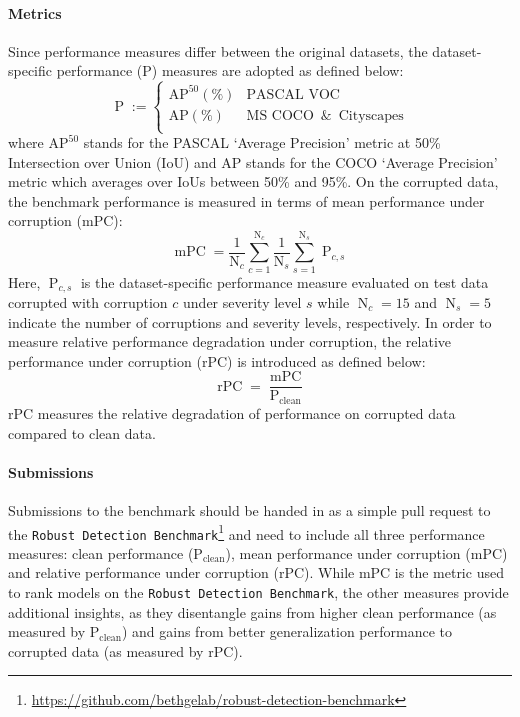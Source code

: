 \documentclass{article}
\begin{document}
\paragraph{Metrics} Since performance measures differ between the original datasets, the dataset-specific performance (P) measures are adopted as defined below:
$$\operatorname{P} := \begin{cases}
\operatorname{AP^{50} (\%)} & \text{PASCAL VOC}\\
\operatorname{AP (\%)} & \text{MS COCO}\,\,\, \&\,\,\, \text{Cityscapes}\\
\end{cases}$$
\noindent
where $\operatorname{AP^{50}}$ stands for the PASCAL `Average Precision' metric at 50\% Intersection over Union (IoU) and AP stands for the COCO `Average Precision' metric which averages over IoUs between 50\% and 95\%.
On the corrupted data, the benchmark performance is measured in terms of mean performance under corruption (mPC):
\begin{equation}
    \operatorname{mPC} = \frac{1}{\operatorname{N}_{c}}\sum_{c=1}^{\operatorname{N}_{c}}\frac{1}{\operatorname{N}_{s}}\sum_{s=1}^{\operatorname{N}_{s}}\operatorname{P}_{c,s}
    \label{eq:mPC}
\end{equation}
\noindent
Here, $\operatorname{P}_{c,s}$ is the dataset-specific performance measure evaluated on test data corrupted with corruption $c$ under severity level $s$ while $\operatorname{N}_{c}=15$ and $\operatorname{N}_{s}=5$ indicate the number of corruptions and severity levels, respectively. In order to measure relative performance degradation under corruption, the relative performance under corruption (rPC) is introduced as defined below:
\begin{equation}
    \operatorname{rPC} = \frac{\operatorname{mPC}}{\operatorname{P_{clean}}}
    \label{eq:rPC}
\end{equation}
\noindent
rPC measures the relative degradation of performance on corrupted data compared to clean data.

\paragraph{Submissions} Submissions to the benchmark should be handed in as a simple pull request to the \texttt{Robust Detection Benchmark}\footnote{\url{https://github.com/bethgelab/robust-detection-benchmark}} and need to include all three performance measures: clean performance ($\operatorname{P_{clean}}$), mean performance under corruption (mPC) and relative performance under corruption (rPC). While mPC is the metric used to rank models on the \texttt{Robust Detection Benchmark}, the other measures provide additional insights, as they disentangle gains from higher clean performance (as measured by $\operatorname{P_{clean}}$) and gains from better generalization performance to corrupted data (as measured by rPC).
\end{document}
